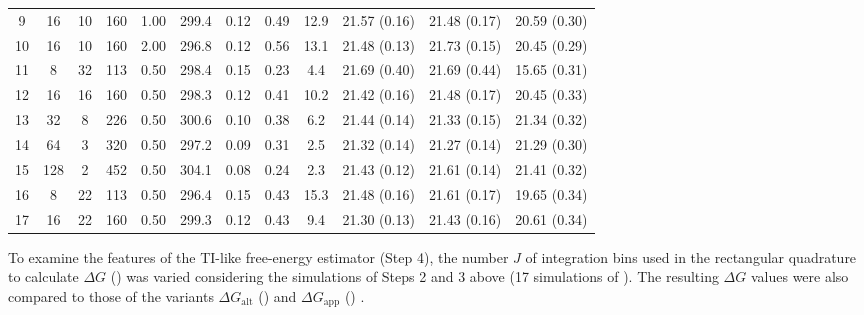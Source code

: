 \begin{table}
{\begin{tabular}{*{12}{c}}
    9 &    16 &    10 &   160 &  1.00 &      299.4 &       0.12 &       0.49 &       12.9 &      21.57 (0.16) &      21.48 (0.17) &      20.59 (0.30) \\ 
   10 &    16 &    10 &   160 &  2.00 &      296.8 &       0.12 &       0.56 &       13.1 &      21.48 (0.13) &      21.73 (0.15) &      20.45 (0.29) \\ 
\hline
   11 &     8 &    32 &   113 &  0.50 &      298.4 &       0.15 &       0.23 &        4.4 &      21.69 (0.40) &      21.69 (0.44) &      15.65 (0.31) \\ 
   12 &    16 &    16 &   160 &  0.50 &      298.3 &       0.12 &       0.41 &       10.2 &      21.42 (0.16) &      21.48 (0.17) &      20.45 (0.33) \\ 
   13 &    32 &     8 &   226 &  0.50 &      300.6 &       0.10 &       0.38 &        6.2 &      21.44 (0.14) &      21.33 (0.15) &      21.34 (0.32) \\ 
   14 &    64 &     3 &   320 &  0.50 &      297.2 &       0.09 &       0.31 &        2.5 &      21.32 (0.14) &      21.27 (0.14) &      21.29 (0.30) \\ 
   15 &   128 &     2 &   452 &  0.50 &      304.1 &       0.08 &       0.24 &        2.3 &      21.43 (0.12) &      21.61 (0.14) &      21.41 (0.32) \\ 
\hline
   16 &     8 &    22 &   113 &  0.50 &      296.4 &       0.15 &       0.43 &       15.3 &      21.48 (0.16) &      21.61 (0.17) &      19.65 (0.34) \\ 
   17 &    16 &    22 &   160 &  0.50 &      299.3 &       0.12 &       0.43 &        9.4 &      21.30 (0.13) &      21.43 (0.16) &      20.61 (0.34) \\ 
\end{tabular}
}
\end{table}



%
To examine the features of the TI-like free-energy estimator (Step 4),
the number $J$ of integration bins
used in the rectangular quadrature to calculate $\Delta G$ () was varied  considering the simulations of Steps 2 and 3 above (17 simulations of ). 
%
%
%
The resulting $\Delta G$ values were also compared to those 
of the variants $\Delta G_{\mathrm{alt}}$ () 
and $\Delta G_{\mathrm{app}}$ () .




